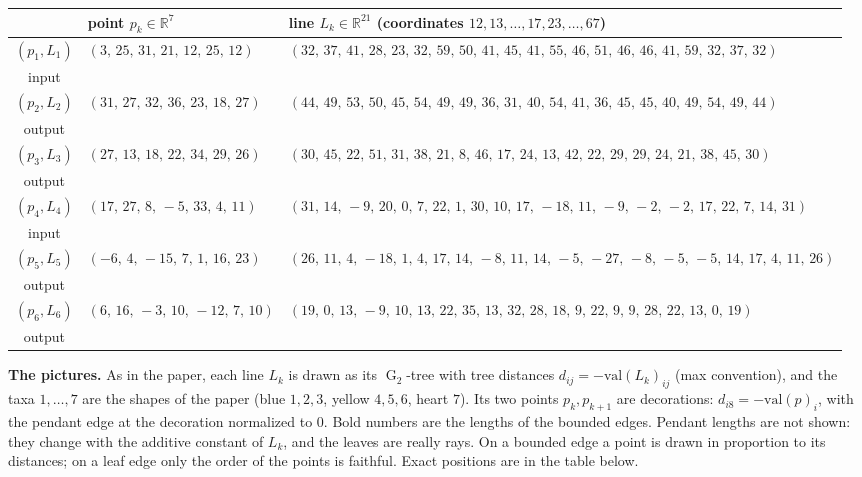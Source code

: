 \documentclass[10pt]{article}
\newcommand{\RR}{\mathbb{R}}
\newcommand{\Ggroup}{\operatorname{G}_2}
\begin{document}
\medskip
{\small
\begin{tabular}{@{}c l l@{}}\toprule
& point \(p_k\in\RR^7\) & line \(L_k\in\RR^{21}\) (coordinates \(12,13,\dots,17,23,\dots,67\)) \\\midrule
\((p_{1},L_{1})\) & \((3,\,25,\,31,\,21,\,12,\,25,\,12)\) & \((32,\,37,\,41,\,28,\,23,\,32,\,59,\,50,\,41,\,45,\,41,\,55,\,46,\,51,\,46,\,46,\,41,\,59,\,32,\,37,\,32)\) \\[-1pt]
\multicolumn{1}{c}{\scriptsize input} &&\\[2pt]
\((p_{2},L_{2})\) & \((31,\,27,\,32,\,36,\,23,\,18,\,27)\) & \((44,\,49,\,53,\,50,\,45,\,54,\,49,\,49,\,36,\,31,\,40,\,54,\,41,\,36,\,45,\,45,\,40,\,49,\,54,\,49,\,44)\) \\[-1pt]
\multicolumn{1}{c}{\scriptsize output} &&\\[2pt]
\((p_{3},L_{3})\) & \((27,\,13,\,18,\,22,\,34,\,29,\,26)\) & \((30,\,45,\,22,\,51,\,31,\,38,\,21,\,8,\,46,\,17,\,24,\,13,\,42,\,22,\,29,\,29,\,24,\,21,\,38,\,45,\,30)\) \\[-1pt]
\multicolumn{1}{c}{\scriptsize output} &&\\[2pt]
\((p_{4},L_{4})\) & \((17,\,27,\,8,\,-5,\,33,\,4,\,11)\) & \((31,\,14,\,-9,\,20,\,0,\,7,\,22,\,1,\,30,\,10,\,17,\,-18,\,11,\,-9,\,-2,\,-2,\,17,\,22,\,7,\,14,\,31)\) \\[-1pt]
\multicolumn{1}{c}{\scriptsize input} &&\\[2pt]
\((p_{5},L_{5})\) & \((-6,\,4,\,-15,\,7,\,1,\,16,\,23)\) & \((26,\,11,\,4,\,-18,\,1,\,4,\,17,\,14,\,-8,\,11,\,14,\,-5,\,-27,\,-8,\,-5,\,-5,\,14,\,17,\,4,\,11,\,26)\) \\[-1pt]
\multicolumn{1}{c}{\scriptsize output} &&\\[2pt]
\((p_{6},L_{6})\) & \((6,\,16,\,-3,\,10,\,-12,\,7,\,10)\) & \((19,\,0,\,13,\,-9,\,10,\,13,\,22,\,35,\,13,\,32,\,28,\,18,\,9,\,22,\,9,\,9,\,28,\,22,\,13,\,0,\,19)\) \\[-1pt]
\multicolumn{1}{c}{\scriptsize output} &&\\[2pt]
\bottomrule\end{tabular}
}

\medskip
\textbf{The pictures.} As in the paper, each line \(L_k\) is drawn as its \(\Ggroup\)-tree with tree distances
\(d_{ij} = -\mathrm{val}(L_k)_{ij}\) (max convention), and the taxa \(1,\dots,7\) are the shapes of the paper (blue
\(1,2,3\), yellow \(4,5,6\), heart \(7\)). Its two points \(p_k, p_{k+1}\) are decorations: \(d_{i8} = -\mathrm{val}(p)_i\), with the
pendant edge at the decoration normalized to \(0\). Bold numbers are the lengths of the bounded edges. Pendant
lengths are not shown: they change with the additive constant of \(L_k\), and the leaves are really rays. On a
bounded edge a point is drawn in proportion to its distances; on a leaf edge only the order of the points is
faithful. Exact positions are in the table below.
\end{document}
